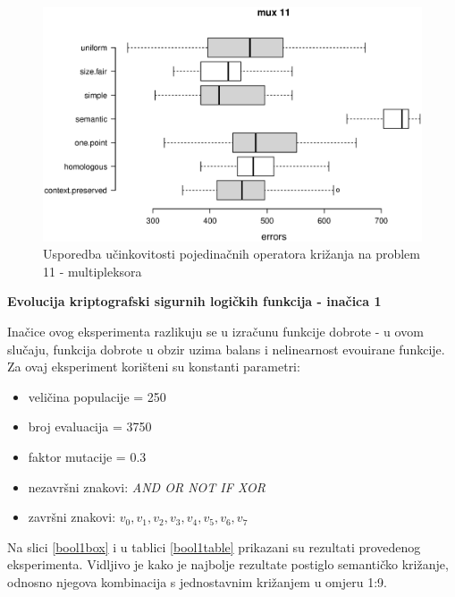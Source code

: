 \begin{figure}[H]
	\centering
	\includegraphics[trim=0cm 4cm 0cm 0cm, scale=0.6]{./slike/boxPlots/mux11.eps}
	\caption{Usporedba učinkovitosti pojedinačnih operatora križanja na problem 11 - multipleksora}
	\label{mux11box}
\end{figure}

\textbf{Evolucija kriptografski sigurnih logičkih funkcija - inačica 1}

Inačice ovog eksperimenta razlikuju se u izračunu funkcije dobrote - u ovom slučaju, funkcija dobrote u obzir uzima balans i nelinearnost evouirane funkcije. Za ovaj eksperiment korišteni su konstanti parametri:
\begin{itemize}
\item{veličina populacije = 250}
\item{broj evaluacija = 3750}
\item{faktor mutacije = 0.3}
\item{nezavršni znakovi: \textit{AND OR NOT IF XOR}}
\item{završni znakovi: \textit{$v_0, v_1, v_2, v_3, v_4, v_5, v_6, v_7$}}
\end{itemize}

Na slici \ref{bool1box} i u tablici \ref{bool1table} prikazani su rezultati provedenog eksperimenta. Vidljivo je kako je najbolje rezultate postiglo semantičko križanje, odnosno njegova kombinacija s jednostavnim križanjem u omjeru 1:9.

